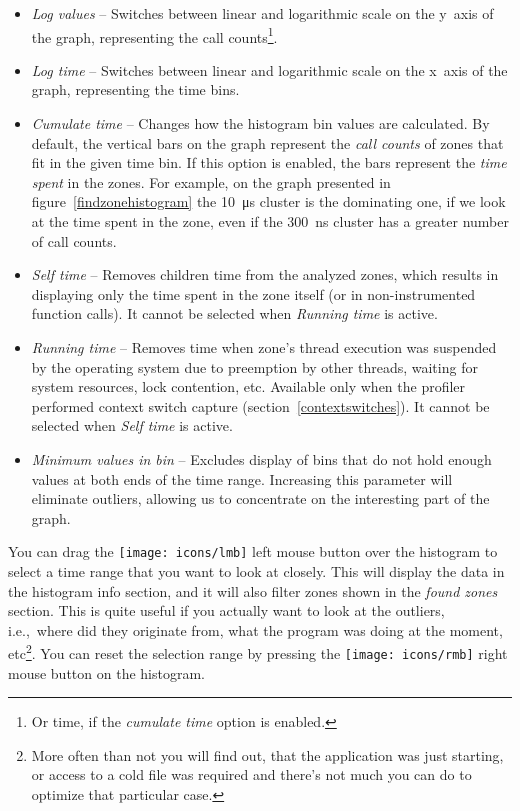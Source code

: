 \documentclass[hidelinks,titlepage,a4paper,twoside]{article}
\newcommand{\LMB}{\texttt{[image: icons/lmb]}}
\newcommand{\RMB}{\texttt{[image: icons/rmb]}}
\begin{document}
\begin{itemize}
\item \emph{Log values} -- Switches between linear and logarithmic scale on the y~axis of the graph, representing the call counts\footnote{Or time, if the \emph{cumulate time} option is enabled.}.
\item \emph{Log time} -- Switches between linear and logarithmic scale on the x~axis of the graph, representing the time bins.
\item \emph{Cumulate time} -- Changes how the histogram bin values are calculated. By default, the vertical bars on the graph represent the \emph{call counts} of zones that fit in the given time bin. If this option is enabled, the bars represent the \emph{time spent} in the zones. For example, on the graph presented in figure~\ref{findzonehistogram} the 10~\si{\micro\second} cluster is the dominating one, if we look at the time spent in the zone, even if the 300~\si{\nano\second} cluster has a greater number of call counts.
\item \emph{Self time} -- Removes children time from the analyzed zones, which results in displaying only the time spent in the zone itself (or in non-instrumented function calls). It cannot be selected when \emph{Running time} is active.
\item \emph{Running time} -- Removes time when zone's thread execution was suspended by the operating system due to preemption by other threads, waiting for system resources, lock contention, etc. Available only when the profiler performed context switch capture (section~\ref{contextswitches}). It cannot be selected when \emph{Self time} is active.
\item \emph{Minimum values in bin} -- Excludes display of bins that do not hold enough values at both ends of the time range. Increasing this parameter will eliminate outliers, allowing us to concentrate on the interesting part of the graph.
\end{itemize}

You can drag the \LMB{} left mouse button over the histogram to select a time range that you want to look at closely. This will display the data in the histogram info section, and it will also filter zones shown in the \emph{found zones} section. This is quite useful if you actually want to look at the outliers, i.e.,\ where did they originate from, what the program was doing at the moment, etc\footnote{More often than not you will find out, that the application was just starting, or access to a cold file was required and there's not much you can do to optimize that particular case.}. You can reset the selection range by pressing the \RMB{} right mouse button on the histogram.
\end{document}
